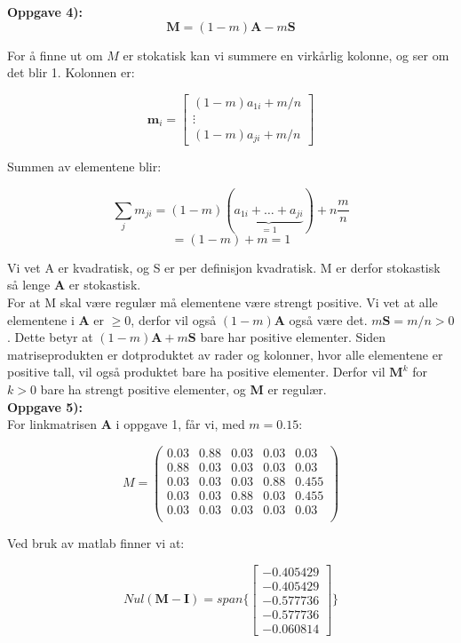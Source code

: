 \documentclass[a4paper,norsk,11pt,twoside]{article}
\begin{document}
\textbf{Oppgave 4):}\\

$$
\textbf{M} = (1-m)\textbf{A} - m\textbf{S}
$$

For å finne ut om $M$ er stokatisk kan vi summere en virkårlig kolonne, og ser om det blir 1. Kolonnen er:

$$
\textbf{m}_i =
\begin{bmatrix}
(1-m)a_{1i} + m/n\\ \vdots \\ (1-m)a_{ji} + m/n
\end{bmatrix}
$$

Summen av elementene blir:

$$
\sum_j m_{ji} =  (1-m)(\underbrace{a_{1i} + \ldots + a_{ji}}_{=1}) + n\frac{m}{n}
$$
$$
= (1-m) + m = 1
$$

Vi vet A er kvadratisk, og S er per definisjon kvadratisk. M er derfor stokastisk så lenge \textbf{A} er stokastisk.\\

For at M skal være regulær må elementene være strengt positive. Vi vet at alle elementene i \textbf{A} er $\geq 0$, derfor vil også $(1-m)\textbf{A}$ også være det. $m\textbf{S} = m/n > 0$. Dette betyr at $(1-m)\textbf{A} + m\textbf{S}$ bare har positive elementer. Siden matriseprodukten er dotproduktet av rader og kolonner, hvor alle elementene er positive tall, vil også produktet bare ha positive elementer. Derfor vil $\textbf{M}^{k}$ for $k>0$ bare ha strengt positive elementer, og \textbf{M} er regulær.\\

\textbf{Oppgave 5):}\\

For linkmatrisen \textbf{A} i oppgave 1, får vi, med $m = 0.15$:

$$
M = 
\begin{pmatrix}
0.03 & 0.88 & 0.03 & 0.03 & 0.03\\
0.88 & 0.03 & 0.03 & 0.03 & 0.03\\
0.03 & 0.03 & 0.03 & 0.88 & 0.455\\
0.03 & 0.03 & 0.88 & 0.03 & 0.455\\
0.03 & 0.03 & 0.03 & 0.03 & 0.03\\
\end{pmatrix}
$$

Ved bruk av matlab finner vi at:

$$
Nul(\textbf{M} - \textbf{I}) = span\{ \begin{bmatrix}
-0.405429 \\ -0.405429 \\ -0.577736 \\ -0.577736 \\ -0.060814
\end{bmatrix} \}
$$
\end{document}
